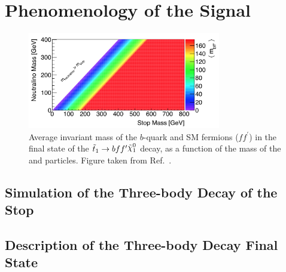 \section{Phenomenology of the Signal}
\label{sec:stop_pheno}

\begin{figure}[!htb]
    \begin{center}
        \includegraphics[width=0.75\textwidth]{figures/search_stop2l/nachman_stop_phase_space}
        \caption{
            Average invariant mass of the $b$-quark and SM fermions ($f f^{\prime}$) in the
            final state of the $\stopone \rightarrow b f f^{\prime} \ninoone$ decay, as a function of the mass
            of the \stopone and \ninoone particles.
            Figure taken from Ref.~\cite{Nachman:2016qyc}.
        }
        \label{fig:stop_phase_space}
    \end{center}
\end{figure}

\subsection{Simulation of the Three-body Decay of the Stop}
\label{sec:stop_sim}



\cite{Belanger:2012tm,Perelstein:2008zt,Low:2013aza}

\subsection{Description of the Three-body Decay Final State}
\label{sec:stop_final_state}


